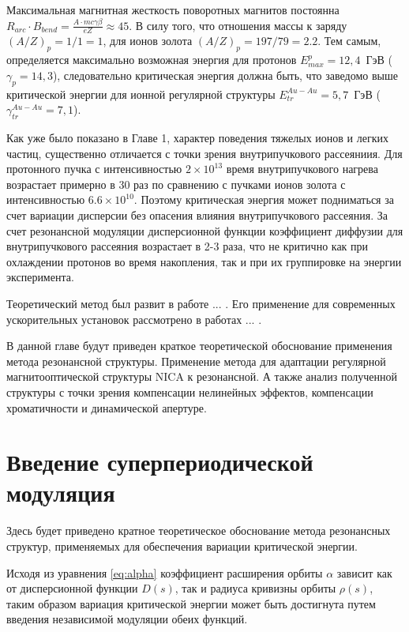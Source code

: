 \par Максимальная магнитная жесткость поворотных магнитов постоянна $R_{arc}\cdot B_{bend}=\frac{A\cdot m c\gamma\beta}{eZ}\approx45$. В силу того, что отношения массы к заряду $\left(A/Z\right)_{p}=1/1=1$, для ионов золота $\left(A/Z\right)_{p}=197/79=2.2$. Тем самым, определяется максимально возможная энергия для протонов $E_{max}^p=12,4$\ ГэВ ($\gamma_{p}=14,3$), следовательно критическая энергия должна быть, что заведомо выше критической энергии для ионной регулярной структуры $E_{tr}^{Au-Au}=5,7$\ ГэВ ( $\gamma_{tr}^{Au-Au}=7,1$).

\par Как уже было показано в Главе 1, характер поведения тяжелых ионов и легких частиц, существенно отличается с точки зрения внутрипучкового рассеяниия. Для протонного пучка с интенсивностью $2\times10^{13}$ время внутрипучкового нагрева возрастает примерно в 30 раз по сравнению с пучками ионов золота с интенсивностью $6.6\times10^{10}$. Поэтому критическая энергия может подниматься за счет вариации дисперсии без опасения влияния внутрипучкового рассеяния. За счет резонансной модуляции дисперсионной функции коэффициент диффузии для внутрипучкового рассеяния возрастает в 2-3 раза, что не критично как при охлаждении протонов во время накопления, так и при их группировке на энергии эксперимента.

\par Теоретический метод был развит в работе ... . Его применение для современных ускорительных установок рассмотрено в работах ... .

\par В данной главе будут приведен краткое теоретической обоснование применения метода резонансной структуры. Применение метода для адаптации регулярной магнитооптической структуры NICA к резонансной. А также анализ полученной структуры с точки зрения компенсации нелинейных эффектов, компенсации хроматичности и  динамической апертуре.
  
\section{Введение суперпериодической модуляция}\label{sec:transition_variation/methods/resonant}

\par Здесь будет приведено кратное теоретическое обоснование метода резонансных структур, применяемых для обеспечения вариации критической энергии.

\par Исходя из уравнения \ref{eq:alpha} коэффициент расширения орбиты $\alpha$ зависит как от дисперсионной функции $D(s)$, так и радиуса кривизны орбиты $\rho(s)$, таким образом вариация критической энергии может быть достигнута путем введения независимой модуляции обеих функций.


